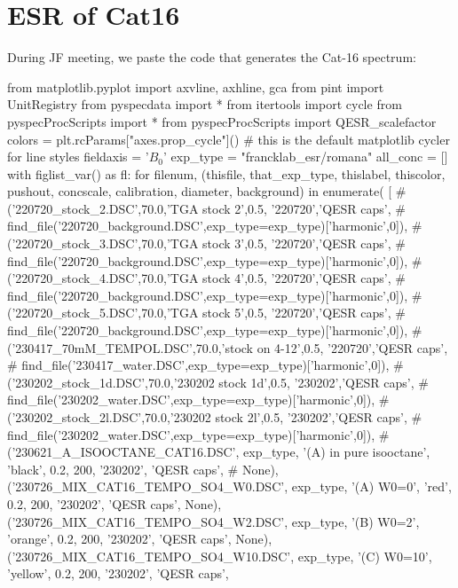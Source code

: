 \section{ESR of Cat16}
During JF meeting, we paste the code that generates the Cat-16 spectrum:
\par
\begin{python}
from matplotlib.pyplot import axvline, axhline, gca
from pint import UnitRegistry
from pyspecdata import *
from itertools import cycle
from pyspecProcScripts import *
from pyspecProcScripts import QESR_scalefactor
colors = plt.rcParams["axes.prop_cycle"]() # this is the default matplotlib cycler for line styles
fieldaxis = '$B_0$'
exp_type = "francklab_esr/romana"
all_conc = []
with figlist_var() as fl:
    for filenum, (thisfile, that_exp_type, thislabel, thiscolor, pushout, concscale, calibration, diameter,
            background) in enumerate(
            [
              #('220720_stock_2.DSC',70.0,'TGA stock 2',0.5, '220720','QESR caps',
              #    find_file('220720_background.DSC',exp_type=exp_type)['harmonic',0]),
              #('220720_stock_3.DSC',70.0,'TGA stock 3',0.5, '220720','QESR caps',
              #    find_file('220720_background.DSC',exp_type=exp_type)['harmonic',0]),
              #('220720_stock_4.DSC',70.0,'TGA stock 4',0.5, '220720','QESR caps',
              #    find_file('220720_background.DSC',exp_type=exp_type)['harmonic',0]),
              #('220720_stock_5.DSC',70.0,'TGA stock 5',0.5, '220720','QESR caps',
              #    find_file('220720_background.DSC',exp_type=exp_type)['harmonic',0]),
              #('230417_70mM_TEMPOL.DSC',70.0,'stock on 4-12',0.5, '220720','QESR caps',
              #    find_file('230417_water.DSC',exp_type=exp_type)['harmonic',0]),
              #('230202_stock_1d.DSC',70.0,'230202 stock 1d',0.5, '230202','QESR caps',
              #    find_file('230202_water.DSC',exp_type=exp_type)['harmonic',0]),
              #('230202_stock_2l.DSC',70.0,'230202 stock 2l',0.5, '230202','QESR caps',
              #    find_file('230202_water.DSC',exp_type=exp_type)['harmonic',0]),
              # ('230621_A_ISOOCTANE_CAT16.DSC', exp_type, '(A) in pure isooctane', 'black', 0.2, 200, '230202', 'QESR caps',
              #      None),
               ('230726_MIX_CAT16_TEMPO_SO4_W0.DSC', exp_type, '(A) W0=0', 'red', 0.2, 200, '230202', 'QESR caps',
                    None),
               ('230726_MIX_CAT16_TEMPO_SO4_W2.DSC', exp_type, '(B) W0=2', 'orange', 0.2, 200, '230202', 'QESR caps',
                    None),
               ('230726_MIX_CAT16_TEMPO_SO4_W10.DSC', exp_type, '(C) W0=10', 'yellow', 0.2, 200, '230202', 'QESR caps',

\end{python}
